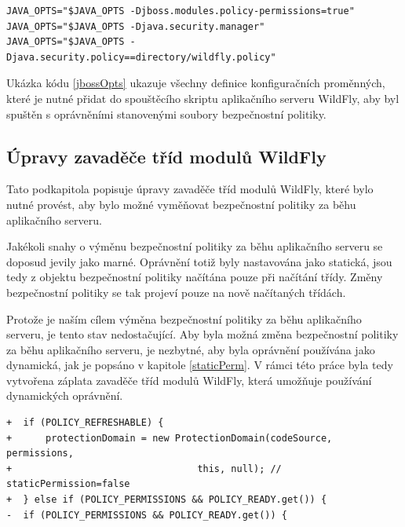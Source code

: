 \begin{lstlisting}[caption=Úprava spouštěcího skriptu pro spuštění se souborem bezpečnostní politiky, label=jbossOpts]
JAVA_OPTS="$JAVA_OPTS -Djboss.modules.policy-permissions=true"
JAVA_OPTS="$JAVA_OPTS -Djava.security.manager"
JAVA_OPTS="$JAVA_OPTS -Djava.security.policy==directory/wildfly.policy"
\end{lstlisting}

Ukázka kódu \ref{jbossOpts} ukazuje všechny definice konfiguračních proměnných, které je nutné přidat do spouštěcího skriptu aplikačního serveru WildFly,
aby byl spuštěn s oprávněními stanovenými soubory bezpečnostní politiky.

\subsection{Úpravy zavaděče tříd modulů WildFly} \label{zmenaZaBehu}

Tato podkapitola popisuje úpravy zavaděče tříd modulů WildFly, které bylo nutné provést, aby bylo možné vyměňovat bezpečnostní politiky za běhu aplikačního serveru.

Jakékoli snahy o výměnu bezpečnostní politiky za běhu aplikačního serveru se doposud jevily jako marné. Oprávnění totiž byly nastavována jako statická,
jsou tedy z objektu bezpečnostní politiky načítána pouze při načítání třídy. Změny bezpečnostní politiky se tak projeví pouze na nově načítaných třídách.

Protože je naším cílem výměna bezpečnostní politiky za běhu aplikačního serveru, je tento stav nedostačující.
Aby byla možná změna bezpečnostní politiky za běhu aplikačního serveru, je nezbytné, aby byla oprávnění používána jako dynamická, jak je popsáno v kapitole \ref{staticPerm}.
V rámci této práce byla tedy vytvořena záplata zavaděče tříd modulů WildFly, která umožňuje používání dynamických oprávnění.

\begin{lstlisting}[caption=Hlavní část záplaty umožňující nastavit používání dynamických oprávnění, label=refreshable]
+  if (POLICY_REFRESHABLE) {
+      protectionDomain = new ProtectionDomain(codeSource, permissions,
+                                 this, null); // staticPermission=false
+  } else if (POLICY_PERMISSIONS && POLICY_READY.get()) {
-  if (POLICY_PERMISSIONS && POLICY_READY.get()) {
\end{lstlisting}

